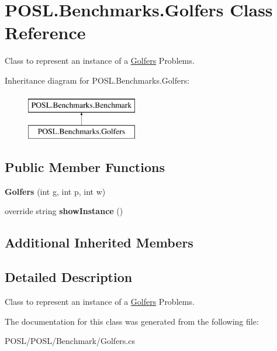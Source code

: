 \hypertarget{classPOSL_1_1Benchmarks_1_1Golfers}{}\section{P\+O\+S\+L.\+Benchmarks.\+Golfers Class Reference}
\label{classPOSL_1_1Benchmarks_1_1Golfers}


Class to represent an instance of a \hyperlink{classPOSL_1_1Benchmarks_1_1Golfers}{Golfers} Problems.  


Inheritance diagram for P\+O\+S\+L.\+Benchmarks.\+Golfers\+:\begin{figure}[H]
\begin{center}
\leavevmode
\includegraphics[height=2.000000cm]{classPOSL_1_1Benchmarks_1_1Golfers}
\end{center}
\end{figure}
\subsection*{Public Member Functions}
\begin{DoxyCompactItemize}
\item 
\mbox{\label{classPOSL_1_1Benchmarks_1_1Golfers_ad094261c60bf502f8324d4bca0086271}} 
{\bfseries Golfers} (int g, int p, int w)
\item 
\mbox{\label{classPOSL_1_1Benchmarks_1_1Golfers_a657477c47bc09d1cb33780670a83d70d}} 
override string {\bfseries show\+Instance} ()
\end{DoxyCompactItemize}
\subsection*{Additional Inherited Members}


\subsection{Detailed Description}
Class to represent an instance of a \hyperlink{classPOSL_1_1Benchmarks_1_1Golfers}{Golfers} Problems. 

The documentation for this class was generated from the following file\+:\begin{DoxyCompactItemize}
\item 
P\+O\+S\+L/\+P\+O\+S\+L/\+Benchmark/Golfers.\+cs\end{DoxyCompactItemize}
